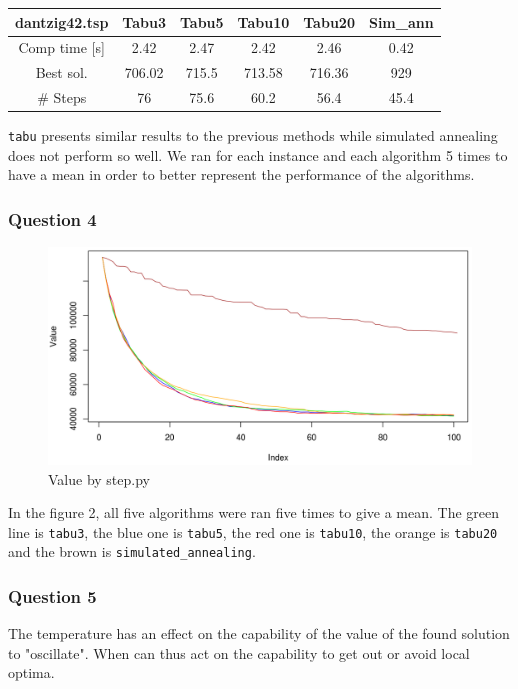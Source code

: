 \documentclass[a4paper,10pt]{article}
\begin{document}
\begin{center}
\begin{tabular}{|c|c|c|c|c|c|}
\hline 
dantzig42.tsp & Tabu3 & Tabu5 & Tabu10 & Tabu20 & Sim\_ann \\
\hline 
Comp time [s] & 2.42 & 2.47 & 2.42 & 2.46 & 0.42 \\ 
\hline 
Best sol. & 706.02 & 715.5 & 713.58 & 716.36 & 929 \\ 
\hline 
\# Steps & 76 & 75.6 & 60.2 & 56.4 & 45.4 \\ 
\hline 
\end{tabular} 
\end{center}
\texttt{tabu} presents similar results to the previous methods while simulated annealing does not perform so well. We ran for each instance and each algorithm 5 times to have a mean in order to better represent the performance of the algorithms.
\subsubsection{Question 4}
\begin{center}
\begin{figure}[ht]
		\includegraphics[scale=.35]{tabu_sa.png}
	\caption{Value by step.py}
\end{figure}
\end{center}
In the figure 2, all five algorithms were ran five times to give a mean. The green line is \texttt{tabu3}, the blue one is \texttt{tabu5}, the red one is \texttt{tabu10}, the orange is \texttt{tabu20} and the brown is \texttt{simulated\_annealing}.
\subsubsection{Question 5}
The temperature has an effect on the capability of the value of the found solution to "oscillate". When can thus act on the capability to get out or avoid local optima.
\end{document}
